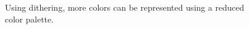 \documentclass{beamer}
\begin{document}
\begin{frame}
   \begin{figure}[!hbp]
   \begin{center}
   \caption{Using dithering, more colors can be represented using a reduced color palette.}
   \end{center}
   \end{figure}   
\end{frame}
\end{document}
